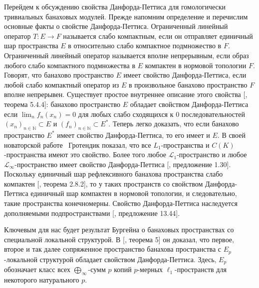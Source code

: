 Перейдем к обсуждению свойства Данфорда-Петтиса для гомологически тривиальных
банаховых модулей. Прежде напомним определение и перечислим основные факты о
свойстве Данфорда-Петтиса. Ограниченный линейный оператор $T:E\to F$ называется
слабо компактным, если он отправляет единичный шар пространства $E$ в
относительно слабо компактное подмножество в $F$. Ограниченный линейный оператор
называется вполне непрерывным, если образ любого слабо компактного подмножества
в $E$ компактен в нормовой топологии $F$. Говорят, что банахово пространство $E$
имеет свойство Данфорда-Петтиса, если любой слабо компактный оператор из $E$ в
произвольное банахово пространство $F$ вполне непрерывен. Существует простое
внутреннее описание этого свойства [\cite{KalAlbTopicsBanSpTh}, теорема 5.4.4]:
банахово пространство $E$ обладает свойством Данфорда-Петтиса если $\lim_n
f_n(x_n)=0$ для любых слабо сходящихся к $0$ последовательностей
${(x_n)}_{n\in\mathbb{N}}\subset E$ и ${(f_n)}_{n\in\mathbb{N}}\subset E^*$. Теперь
легко доказать, что если банахово пространство $E^*$ имеет свойство
Данфорда-Петтиса, то его имеет и $E$. В своей новаторской
работе~\cite{GrothApllFaiblCompSpCK} Гротендик показал, что все
$L_1$-пространства и $C(K)$-пространства имеют это свойство. Более того любое
$\mathscr{L}_1$-пространство и любое $\mathscr{L}_\infty$-пространство имеет
свойство Данфорда-Петтиса  [\cite{BourgNewClOfLpSp}, предложение 1.30].
Поскольку единичный шар рефлексивного банахова пространства слабо компактен
[\cite{MeggIntroBanSpTh}, теорема 2.8.2], то у таких пространств со свойством
Данфорда-Петтиса единичный шар компактен в нормовой топологии, и следовательно,
такие пространства конечномерны. Свойство Данфорда-Петтиса наследуется
дополняемыми подпространствами [\cite{FabHabBanSpTh}, предложение 13.44]. 

Ключевым для нас будет результат Бургейна о банаховых пространствах со
специальной локальной структурой. В [\cite{BourgOnTheDPP}, теорема 5] он
доказал, что первое, второе и так далее сопряженное пространство банахова
пространства с $E_p$-локальной структурой обладает свойством Данфорда-Петтиса.
Здесь, $E_p$ обозначает класс всех $\bigoplus_\infty$-сумм $p$ копий $p$-мерных
$\ell_1$-пространств для некоторого натурального $p$. 


